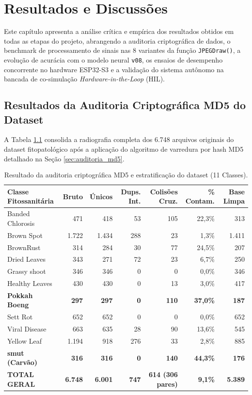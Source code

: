 \chapter{Resultados e Discussões}
\label{cap:resultados}

Este capítulo apresenta a análise crítica e empírica dos resultados obtidos em todas as etapas do projeto, abrangendo a auditoria criptográfica de dados, o benchmark de processamento de sinais nas 8 variantes da função \texttt{JPEGDraw()}, a evolução de acurácia com o modelo neural \texttt{v08}, os ensaios de desempenho concorrente no hardware ESP32-S3 e a validação do sistema autônomo na bancada de co-simulação \textit{Hardware-in-the-Loop} (HIL).

\section{Resultados da Auditoria Criptográfica MD5 do Dataset}

A Tabela \ref{tab:auditoria_md5} consolida a radiografia completa dos 6.748 arquivos originais do dataset fitopatológico após a aplicação do algoritmo de varredura por hash MD5 detalhado na Seção \ref{sec:auditoria_md5}.

\begin{table}[H]
\centering
\small
\caption{Resultado da auditoria criptográfica MD5 e estratificação do dataset (11 Classes).}
\label{tab:auditoria_md5}
\begin{tabular}{lrrrrrr}
\toprule
\textbf{Classe Fitossanitária} & \textbf{Bruto} & \textbf{Únicos} & \textbf{Dups. Int.} & \textbf{Colisões Cruz.} & \textbf{\% Contam.} & \textbf{Base Limpa} \\
\midrule
Banded Chlorosis & 471 & 418 & 53 & 105 & 22,3\% & 313 \\
Brown Spot       & 1.722 & 1.434 & 288 & 23 & 1,3\% & 1.411 \\
BrownRust        & 314 & 284 & 30 & 77 & 24,5\% & 207 \\
Dried Leaves     & 343 & 271 & 72 & 23 & 6,7\% & 250 \\
Grassy shoot     & 346 & 346 & 0 & 0 & 0,0\% & 346 \\
Healthy Leaves   & 430 & 430 & 0 & 13 & 3,0\% & 417 \\
\textbf{Pokkah Boeng} & \textbf{297} & \textbf{297} & \textbf{0} & \textbf{110} & \textbf{37,0\%} & \textbf{187} \\
Sett Rot         & 652 & 652 & 0 & 0 & 0,0\% & 652 \\
Viral Disease    & 663 & 635 & 28 & 90 & 13,6\% & 545 \\
Yellow Leaf      & 1.194 & 918 & 276 & 33 & 2,8\% & 885 \\
\textbf{smut (Carvão)} & \textbf{316} & \textbf{316} & \textbf{0} & \textbf{140} & \textbf{44,3\%} & \textbf{176} \\
\midrule
\textbf{TOTAL GERAL} & \textbf{6.748} & \textbf{6.001} & \textbf{747} & \textbf{614 (306 pares)} & \textbf{9,1\%} & \textbf{5.389} \\
\bottomrule
\end{tabular}
\end{table}

